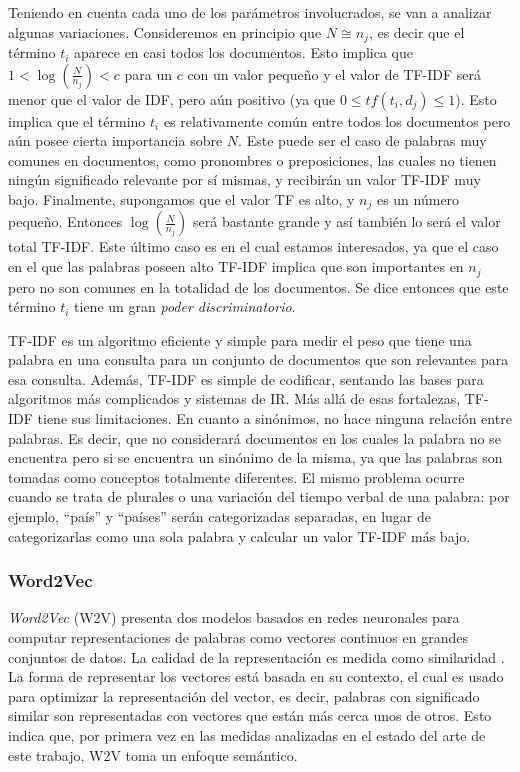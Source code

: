 \bigskip Teniendo en cuenta cada uno de los parámetros involucrados, se van a analizar algunas variaciones. Consideremos en principio que \(N \cong n_j\), es decir que el término \(t_i\) aparece en casi todos los documentos. Esto implica que \(1 < \log(\frac{N}{n_j}) < c \) para un \(c\) con un valor pequeño y el valor de TF-IDF será menor que el valor de IDF, pero aún positivo (ya que \(0 \leq tf(t_i,d_j) \leq 1\)). Esto implica que el término \(t_i\) es relativamente común entre todos los documentos pero aún posee cierta importancia sobre \(N\). Este puede ser el caso de palabras muy comunes en documentos, como pronombres o preposiciones, las cuales no tienen ningún significado relevante por sí mismas, y recibirán un valor TF-IDF muy bajo. Finalmente, supongamos que el valor TF es alto, y \(n_j\) es un número pequeño. Entonces \(\log(\frac{N}{n_j})\) será bastante grande y así también lo será el valor total TF-IDF. Este último caso es en el cual estamos interesados, ya que el caso en el que las palabras poseen alto TF-IDF implica que son importantes en \(n_j\) pero no son comunes en la totalidad de los documentos. Se dice entonces que este término \(t_i\) tiene un gran \textit{poder discriminatorio}.

\bigskip TF-IDF es un algoritmo eficiente y simple para medir el peso que tiene una palabra en una consulta para un conjunto de documentos que son relevantes para esa consulta. Además, TF-IDF es simple de codificar, sentando las bases para algoritmos más complicados y sistemas de IR. Más allá de esas fortalezas, TF-IDF tiene sus limitaciones. En cuanto a sinónimos, no hace ninguna relación entre palabras. Es decir, que no considerará documentos en los cuales la palabra no se encuentra pero si se encuentra un sinónimo de la misma, ya que las palabras son tomadas como conceptos totalmente diferentes. El mismo problema ocurre cuando se trata de plurales o una variación del tiempo verbal de una palabra: por ejemplo, “país” y “países” serán categorizadas separadas, en lugar de categorizarlas como una sola palabra y calcular un valor TF-IDF más bajo.

\subsubsection{Word2Vec}
\textit{Word2Vec} (W2V) presenta dos modelos basados en redes neuronales para computar representaciones de palabras como vectores continuos en grandes conjuntos de datos. La calidad de la representación es medida como similaridad \citep{mikolov2013efficient}. La forma de representar los vectores está basada en su contexto, el cual es usado para optimizar la representación del vector, es decir, palabras con significado similar son representadas con vectores que están más cerca unos de otros. Esto indica que, por primera vez en las medidas analizadas en el estado del arte de este trabajo, W2V toma un enfoque semántico.

